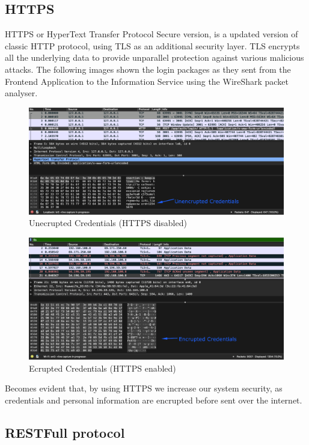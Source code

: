 		\subsection{HTTPS}
			HTTPS or HyperText Transfer Protocol Secure version, is a updated version of classic HTTP protocol, using TLS as an additional security layer. TLS 
			encrypts all the underlying data to provide unparallel protection against various malicious attacks. The following images shown the login packages as
			they sent from the Frontend Application to the Information Service using the WireShark packet analyser.
			\begin{figure}[H]
				\iftrue
				\caption{Unecrupted Credentials (HTTPS disabled)}
				\centering
				\includegraphics[scale=0.3]{figures/http}
				\fi
			\end{figure}
			\begin{figure}[H]
				\iftrue
				\caption{Ecrupted Credentials (HTTPS enabled)}
				\centering
				\includegraphics[scale=0.3]{figures/https}
				\fi
			\end{figure}
			Becomes evident that, by using HTTPS we increase our system security, as credentials and personal information are encrupted before sent over the
			internet.
		\subsection{RESTFull protocol}
			
